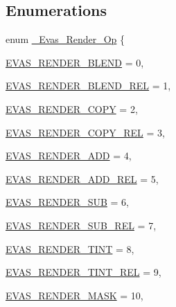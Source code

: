 \subsection*{Enumerations}
\begin{DoxyCompactItemize}
\item 
enum \hyperlink{group__Evas__Object__Group__Extras_ga551375283a5e2b0abffd5f40582e9ce2}{\_\-Evas\_\-Render\_\-Op} \{ \par
\hyperlink{group__Evas__Object__Group__Extras_gga551375283a5e2b0abffd5f40582e9ce2ade640652f7342e2e2151bb7bd0bee31e}{EVAS\_\-RENDER\_\-BLEND} =  0, 
\par
\hyperlink{group__Evas__Object__Group__Extras_gga551375283a5e2b0abffd5f40582e9ce2af49b4dbb7b8c61b595f143c7415b9eb7}{EVAS\_\-RENDER\_\-BLEND\_\-REL} =  1, 
\par
\hyperlink{group__Evas__Object__Group__Extras_gga551375283a5e2b0abffd5f40582e9ce2a695c8ae11f59b4b5cd9907767ff5e7bd}{EVAS\_\-RENDER\_\-COPY} =  2, 
\par
\hyperlink{group__Evas__Object__Group__Extras_gga551375283a5e2b0abffd5f40582e9ce2a7e4cca2acc2088c71cdebca03d7e3cea}{EVAS\_\-RENDER\_\-COPY\_\-REL} =  3, 
\par
\hyperlink{group__Evas__Object__Group__Extras_gga551375283a5e2b0abffd5f40582e9ce2a950b6045d15e439b98badc63d9c52926}{EVAS\_\-RENDER\_\-ADD} =  4, 
\par
\hyperlink{group__Evas__Object__Group__Extras_gga551375283a5e2b0abffd5f40582e9ce2a7771ae083fb87f50a203cc643cb670cc}{EVAS\_\-RENDER\_\-ADD\_\-REL} =  5, 
\par
\hyperlink{group__Evas__Object__Group__Extras_gga551375283a5e2b0abffd5f40582e9ce2a3183f3f43c243373ca0d63e134342e27}{EVAS\_\-RENDER\_\-SUB} =  6, 
\par
\hyperlink{group__Evas__Object__Group__Extras_gga551375283a5e2b0abffd5f40582e9ce2ab6167dbd8428b155181368f3d0eb349c}{EVAS\_\-RENDER\_\-SUB\_\-REL} =  7, 
\par
\hyperlink{group__Evas__Object__Group__Extras_gga551375283a5e2b0abffd5f40582e9ce2a9d1d18d6f8e8497db805b3539ff4a2e9}{EVAS\_\-RENDER\_\-TINT} =  8, 
\par
\hyperlink{group__Evas__Object__Group__Extras_gga551375283a5e2b0abffd5f40582e9ce2a074b198fc95213003d51be4e1b2988c6}{EVAS\_\-RENDER\_\-TINT\_\-REL} =  9, 
\par
\hyperlink{group__Evas__Object__Group__Extras_gga551375283a5e2b0abffd5f40582e9ce2ad84a48299047fa2e2fb0d9807cae9b2f}{EVAS\_\-RENDER\_\-MASK} =  10, 
\par

\end{DoxyCompactItemize}
